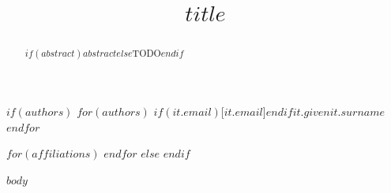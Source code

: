\documentclass[tc, manuscript]{copernicus}
\begin{document}
\title{$title$}

$if(authors)$
$for(authors)$
\Author[$it.affil$]$if(it.email)$[$it.email$]$endif${$it.given$}{$it.surname$}
$endfor$

$for(affiliations)$
$endfor$
$else$
$endif$



\received{}
\pubdiscuss{}
\revised{}
\accepted{}
\published{}


\maketitle

\begin{abstract}
$if(abstract)$$abstract$$else$TODO$endif$
\end{abstract}

$body$



\end{document}
